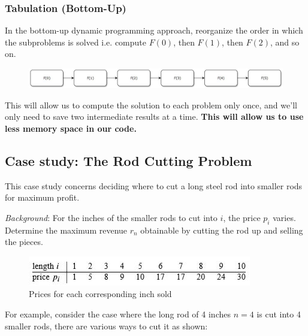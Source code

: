 \documentclass[10pt,a4paper]{article}
\begin{document}
\pagebreak

\subsubsection{Tabulation (Bottom-Up)}

In the bottom-up dynamic programming approach, reorganize the order in which the subproblems is
solved i.e. compute $F(0)$, then $F(1)$, then $F(2)$, and so on.
\begin{figure} [h!]
    \centering
    \includegraphics[scale=0.4]{bot.JPG}
\end{figure}

This will allow us to compute the solution to each problem only once, and we’ll only need to save
two intermediate results at a time. \textbf{This will allow us to use less memory space in our code.}

\pagebreak

\subsection{Case study: The Rod Cutting Problem}

This case study concerns deciding where to cut a long steel rod into smaller rods for maximum
profit. \par

\textit{Background}: For the inches of the smaller rods to cut into $i$, the price $p_i$ varies.
Determine the maximum revenue $r_n$ obtainable by cutting the rod up and selling the pieces.

\begin{figure} [h!]
    \centering
    \includegraphics[]{Inche.JPG}
    \caption{Prices for each corresponding inch sold}
\end{figure}

For example, consider the case where the long rod of 4 inches $n=4$ is cut into 4 smaller rods,
there are various ways to cut it as shown:
\end{document}
